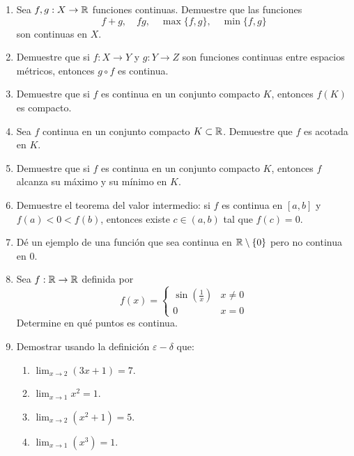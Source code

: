 \begin{enumerate}
    \item Sea $f, g : X \to \mathbb{R}$ funciones continuas. Demuestre que las funciones
    \[ f+g, \quad fg, \quad \max\{f, g\}, \quad \min\{f, g\} \]
    son continuas en $X$.
    
    \item Demuestre que si $f : X \to Y$ y $g : Y \to Z$ son funciones continuas entre espacios métricos, entonces $g \circ f$ es continua.
    
    \item Demuestre que si $f$ es continua en un conjunto compacto $K$, entonces $f(K)$ es compacto.
    
    \item Sea $f$ continua en un conjunto compacto $K \subset \mathbb{R}$. Demuestre que $f$ es acotada en $K$.
    
    \item Demuestre que si $f$ es continua en un conjunto compacto $K$, entonces $f$ alcanza su máximo y su mínimo en $K$.
    
    \item Demuestre el teorema del valor intermedio: si $f$ es continua en $[a, b]$ y $f(a) < 0 < f(b)$, entonces existe $c \in (a, b)$ tal que $f(c) = 0$.
    
    \item Dé un ejemplo de una función que sea continua en $\mathbb{R} \setminus \{0\}$ pero no continua en $0$.
    
    \item Sea $f : \mathbb{R} \to \mathbb{R}$ definida por
    \[ f(x) = \begin{cases} \sin\left(\frac{1}{x}\right) & x \neq 0 \\ 0 & x = 0 \end{cases} \]
    Determine en qué puntos es continua.

    \item Demostrar usando la definición $\varepsilon-\delta$ que:
    \begin{enumerate}
        \item[a)] $\lim_{x \to 2} (3x + 1) = 7$.
        \item[b)] $\lim_{x \to 1} x^2 = 1$.
        \item[c)] $\lim_{x \to 2} (x^2 + 1) = 5$.
        \item[d)] $\lim_{x \to 1} (x^3) = 1$.
    \end{enumerate}
\end{enumerate}
